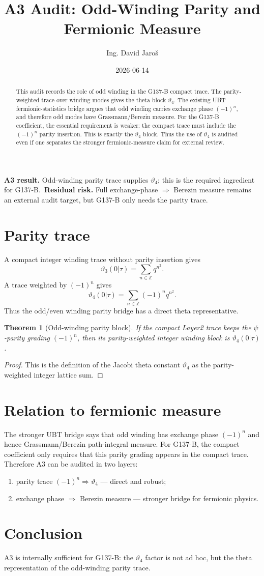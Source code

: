 \documentclass[12pt,a4paper]{article}
\title{A3 Audit: Odd-Winding Parity and Fermionic Measure}
\author{Ing. David Jaroš}
\date{2026-06-14}
\newtheorem{theorem}{Theorem}[section]
\begin{document}
\maketitle
\begin{abstract}
This audit records the role of odd winding in the G137-B compact trace.  The parity-weighted trace over winding modes gives the theta block $\vartheta_4$.  The existing UBT fermionic-statistics bridge argues that odd winding carries exchange phase $(-1)^n$, and therefore odd modes have Grassmann/Berezin measure.  For the G137-B coefficient, the essential requirement is weaker: the compact trace must include the $(-1)^n$ parity insertion.  This is exactly the $\vartheta_4$ block.  Thus the use of $\vartheta_4$ is audited even if one separates the stronger fermionic-measure claim for external review.
\end{abstract}
\begin{statusbox}
\textbf{A3 result.} Odd-winding parity trace supplies $\vartheta_4$; this is the required ingredient for G137-B.\
\textbf{Residual risk.} Full exchange-phase $\Rightarrow$ Berezin measure remains an external audit target, but G137-B only needs the parity trace.
\end{statusbox}
\section{Parity trace}
A compact integer winding trace without parity insertion gives
\[
  \vartheta_3(0|\tau)=\sum_{n\in\mathbb Z}q^{n^2}.
\]
A trace weighted by $(-1)^n$ gives
\[
  \vartheta_4(0|\tau)=\sum_{n\in\mathbb Z}(-1)^n q^{n^2}.
\]
Thus the odd/even winding parity bridge has a direct theta representative.
\begin{theorem}[Odd-winding parity block]
If the compact Layer2 trace keeps the $\psi$-parity grading $(-1)^n$, then its parity-weighted integer winding block is $\vartheta_4(0|\tau)$.
\end{theorem}
\begin{proof}
This is the definition of the Jacobi theta constant $\vartheta_4$ as the parity-weighted integer lattice sum.
\end{proof}
\section{Relation to fermionic measure}
The stronger UBT bridge says that odd winding has exchange phase $(-1)^n$ and hence Grassmann/Berezin path-integral measure.  For G137-B, the compact coefficient only requires that this parity grading appears in the compact trace.  Therefore A3 can be audited in two layers:
\begin{enumerate}
\item parity trace $(-1)^n\Rightarrow\vartheta_4$ — direct and robust;
\item exchange phase $\Rightarrow$ Berezin measure — stronger bridge for fermionic physics.
\end{enumerate}
\section{Conclusion}
A3 is internally sufficient for G137-B: the $\vartheta_4$ factor is not ad hoc, but the theta representation of the odd-winding parity trace.
\end{document}
